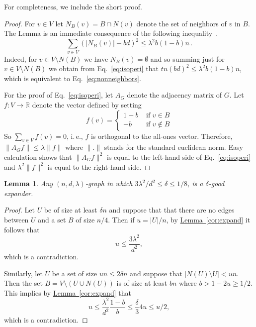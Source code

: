 \documentclass[11pt]{article}
\numberwithin{equation}{section}
\newtheorem{lemma}[theorem]{Lemma}
\theoremstyle{definition}
\theoremstyle{plain}
\newcommand{\R}{\mathbb R}
\newcommand{\ie}{i.\,e.}
\newcommand{\expref}[2]{\hyperref[#2]{#1~\ref{#2}}}
\begin{document}
For completeness, we include the short proof.

\begin{proof}
For $v\in V$ let $N_B(v)=B\cap N(v)$ denote the set of neighbors
of $v$ in $B$.  The Lemma is an immediate consequence of the
following inequality~\cite[Theorem 1]{ABNNR}.
\begin{equation} \label{eq:isoperi}
\sum_{v\in V}\left(|N_B(v)|-bd\right)^2 \le \lambda^2 b(1-b)n\,.
\end{equation}
Indeed, for $v\in V \setminus N(B)$ we have $N_B(v)=\emptyset$
and so summing just for $v\in V \setminus N(B)$ we obtain
from Eq.~\eqref{eq:isoperi} that $tn(bd)^2\le \lambda^2 b(1-b)n$,
which is equivalent to Eq.~\eqref{eq:nonneighbors}.

\noindent
For the proof of Eq.~\eqref{eq:isoperi},
let $A_G$ denote the adjacency matrix of $G$.
Let $f : V\to\R$ denote the vector defined by setting
$$f(v)=\begin{cases} 1-b & \text{ if } v\in B\\
                     -b & \text{ if } v\notin B
        \end{cases} 
$$
So $\sum_{v\in V} f(v)=0$, \ie, $f$ is orthogonal to the 
all-ones vector.  Therefore, $\|A_Gf\|\le \lambda \|f\|$ where
$\|.\|$ stands for the standard euclidean norm.  Easy calculation
shows that $\|A_Gf\|^2$ is equal to the left-hand side of
Eq.~\eqref{eq:isoperi} and $\lambda^2\|f\|^2$ is equal to the 
right-hand side.
\end{proof}
%
%
%
%
%

\begin{lemma} \label{lem:good_expanders} 
Any $(n,d,\lambda)$-graph
in which ${3 \lambda^2}/{d^2} \leq \delta \leq 1/8$, is a 
$\delta$-good expander.
\end{lemma} 

\begin{proof}
Let $U$ be of size at least $\delta n$ and suppose that that there are no edges between 
$U$ and a set $B$ of size $n/4$. Then if $u = |U|/n$, by 
\expref{Lemma}{cor:expand} it follows that 
\[
u \leq \frac{3 \lambda^2}{d^2},
\]
which is a contradiction. 

Similarly, let $U$ be a set of size  $ u n \leq 2 \delta n$ and suppose that 
$|N(U) \setminus U| < u n$. Then the set $B = V \setminus 
(U \cup N(U))$ is of size 
at least $b n$ where $b > 1- 2 u \geq 1/2$. 
This implies by \expref{Lemma}{cor:expand} that
\[
u \leq \frac{\lambda^2}{d^2} \frac{1-b}{b} \leq \frac{\delta}{3} 4 u \leq u/2,
\]
which is a contradiction.
\end{proof} 
\end{document}
